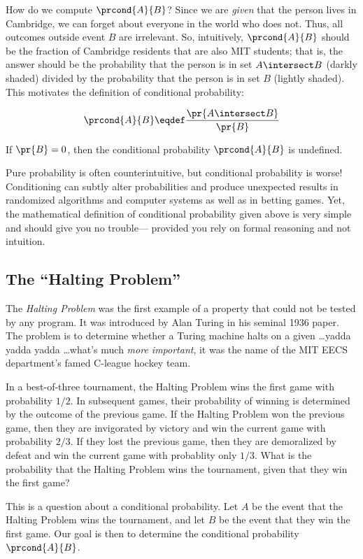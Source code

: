 How do we compute $\prcond{A}{B}$?  Since we are \textit{given} that
the person lives in Cambridge, we can forget about everyone in the
world who does not.  Thus, all outcomes outside event $B$ are
irrelevant.  So, intuitively, $\prcond{A}{B}$ should be the fraction
of Cambridge residents that are also MIT students; that is, the answer
should be the probability that the person is in set $A \intersect B$ (darkly
shaded) divided by the probability that the person is in set $B$
(lightly shaded).  This motivates the definition of conditional
probability:
\begin{definition}\label{LN12:prcond}
\[
\prcond{A}{B} \eqdef \frac{\pr{A \intersect B}}{\pr{B}}
\]
\end{definition}
If $\pr{B} = 0$, then the conditional probability $\prcond{A}{B}$ is
undefined.

Pure probability is often counterintuitive, but conditional probability is
worse!  Conditioning can subtly alter probabilities and produce unexpected
results in randomized algorithms and computer systems as well as in
betting games.  Yet, the mathematical definition of conditional
probability given above is very simple and should give you no trouble---
provided you rely on formal reasoning and not intuition.

\subsection{The ``Halting Problem''}

The \emph{Halting Problem} was the first example of a property that could
not be tested by any program.  It was introduced by Alan Turing in his
seminal 1936 paper.  The problem is to determine whether a Turing machine
halts on a given \dots yadda yadda yadda \dots what's much \emph{more
  important}, it was the name of the MIT EECS department's famed C-league
hockey team.

In a best-of-three tournament, the Halting Problem wins the first game
with probability $1/2$.  In subsequent games, their
probability of winning is determined by the outcome of the previous
game.  If the Halting Problem won the previous game, then they are
invigorated by victory and win the current game with probability
$2/3$.  If they lost the previous game, then they are
demoralized by defeat and win the current game with probablity only
$1/3$.  What is the probability that the Halting Problem wins
the tournament, given that they win the first game?


This is a question about a conditional probability.  Let $A$ be the
event that the Halting Problem wins the tournament, and let $B$ be the
event that they win the first game.  Our goal is then to determine the
conditional probability $\prcond{A}{B}$.

